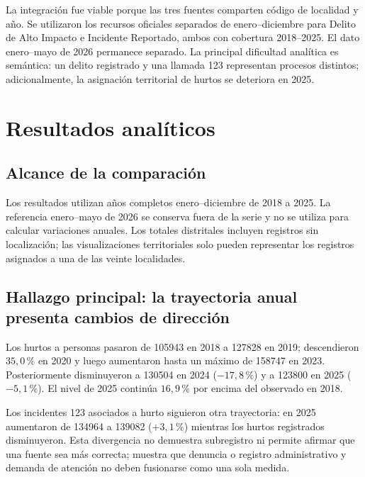 \documentclass[11pt,letterpaper,oneside]{report}
\begin{document}
La integración fue viable porque las tres fuentes comparten código de localidad y año. Se utilizaron los recursos oficiales separados de enero--diciembre para Delito de Alto Impacto e Incidente Reportado, ambos con cobertura 2018--2025. El dato enero--mayo de 2026 permanece separado. La principal dificultad analítica es semántica: un delito registrado y una llamada 123 representan procesos distintos; adicionalmente, la asignación territorial de hurtos se deteriora en 2025.

\chapter{Resultados analíticos}\label{chap:resultados}

\section{Alcance de la comparación}

Los resultados utilizan años completos enero--diciembre de 2018 a 2025. La referencia enero--mayo de 2026 se conserva fuera de la serie y no se utiliza para calcular variaciones anuales. Los totales distritales incluyen registros sin localización; las visualizaciones territoriales solo pueden representar los registros asignados a una de las veinte localidades.

\section{Hallazgo principal: la trayectoria anual presenta cambios de dirección}

Los hurtos a personas pasaron de \num{105943} en 2018 a \num{127828} en 2019; descendieron \(35{,}0\,\%\) en 2020 y luego aumentaron hasta un máximo de \num{158747} en 2023. Posteriormente disminuyeron a \num{130504} en 2024 (\(-17{,}8\,\%\)) y a \num{123800} en 2025 (\(-5{,}1\,\%\)). El nivel de 2025 continúa \(16{,}9\,\%\) por encima del observado en 2018.

Los incidentes 123 asociados a hurto siguieron otra trayectoria: en 2025 aumentaron de \num{134964} a \num{139082} (\(+3{,}1\,\%\)) mientras los hurtos registrados disminuyeron. Esta divergencia no demuestra subregistro ni permite afirmar que una fuente sea más correcta; muestra que denuncia o registro administrativo y demanda de atención no deben fusionarse como una sola medida.
\end{document}
